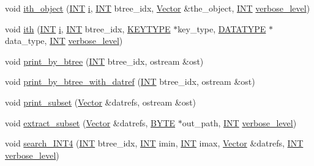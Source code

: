 \begin{DoxyCompactItemize}
\item 
void \mbox{\hyperlink{classdatabase_a1516bb38a4c846172354291271700d07}{ith\+\_\+object}} (\mbox{\hyperlink{galois_8h_a09fddde158a3a20bd2dcadb609de11dc}{I\+NT}} \mbox{\hyperlink{alphabet2_8_c_acb559820d9ca11295b4500f179ef6392}{i}}, \mbox{\hyperlink{galois_8h_a09fddde158a3a20bd2dcadb609de11dc}{I\+NT}} btree\+\_\+idx, \mbox{\hyperlink{class_vector}{Vector}} \&the\+\_\+object, \mbox{\hyperlink{galois_8h_a09fddde158a3a20bd2dcadb609de11dc}{I\+NT}} \mbox{\hyperlink{simeon_8_c_a818073fbcc2f439e7c56952f67386122}{verbose\+\_\+level}})
\item 
void \mbox{\hyperlink{classdatabase_af17af33b686cba55558237b04714108f}{ith}} (\mbox{\hyperlink{galois_8h_a09fddde158a3a20bd2dcadb609de11dc}{I\+NT}} \mbox{\hyperlink{alphabet2_8_c_acb559820d9ca11295b4500f179ef6392}{i}}, \mbox{\hyperlink{galois_8h_a09fddde158a3a20bd2dcadb609de11dc}{I\+NT}} btree\+\_\+idx, \mbox{\hyperlink{discreta_8h_a535c8df88e5939fd8a1a3d083e75124a}{K\+E\+Y\+T\+Y\+PE}} $\ast$key\+\_\+type, \mbox{\hyperlink{discreta_8h_abf512b6b30146dda9c59049478bf3e99}{D\+A\+T\+A\+T\+Y\+PE}} $\ast$data\+\_\+type, \mbox{\hyperlink{galois_8h_a09fddde158a3a20bd2dcadb609de11dc}{I\+NT}} \mbox{\hyperlink{simeon_8_c_a818073fbcc2f439e7c56952f67386122}{verbose\+\_\+level}})
\item 
void \mbox{\hyperlink{classdatabase_ac45ae44f2a861557ced6e5ab7c146717}{print\+\_\+by\+\_\+btree}} (\mbox{\hyperlink{galois_8h_a09fddde158a3a20bd2dcadb609de11dc}{I\+NT}} btree\+\_\+idx, ostream \&ost)
\item 
void \mbox{\hyperlink{classdatabase_af84030a29b31944d6763974ac4f774b5}{print\+\_\+by\+\_\+btree\+\_\+with\+\_\+datref}} (\mbox{\hyperlink{galois_8h_a09fddde158a3a20bd2dcadb609de11dc}{I\+NT}} btree\+\_\+idx, ostream \&ost)
\item 
void \mbox{\hyperlink{classdatabase_a8b454f5428b3f00a2de497f21d73f3fa}{print\+\_\+subset}} (\mbox{\hyperlink{class_vector}{Vector}} \&datrefs, ostream \&ost)
\item 
void \mbox{\hyperlink{classdatabase_abeb9113b3b9f544afe25bd16fd69662d}{extract\+\_\+subset}} (\mbox{\hyperlink{class_vector}{Vector}} \&datrefs, \mbox{\hyperlink{galois_8h_ab6cc7b4aeb6ea31aba2b3fbfc83ff5e6}{B\+Y\+TE}} $\ast$out\+\_\+path, \mbox{\hyperlink{galois_8h_a09fddde158a3a20bd2dcadb609de11dc}{I\+NT}} \mbox{\hyperlink{simeon_8_c_a818073fbcc2f439e7c56952f67386122}{verbose\+\_\+level}})
\item 
void \mbox{\hyperlink{classdatabase_aeda62e67888923cd968674ec2ed08007}{search\+\_\+\+I\+N\+T4}} (\mbox{\hyperlink{galois_8h_a09fddde158a3a20bd2dcadb609de11dc}{I\+NT}} btree\+\_\+idx, \mbox{\hyperlink{galois_8h_a09fddde158a3a20bd2dcadb609de11dc}{I\+NT}} imin, \mbox{\hyperlink{galois_8h_a09fddde158a3a20bd2dcadb609de11dc}{I\+NT}} imax, \mbox{\hyperlink{class_vector}{Vector}} \&datrefs, \mbox{\hyperlink{galois_8h_a09fddde158a3a20bd2dcadb609de11dc}{I\+NT}} \mbox{\hyperlink{simeon_8_c_a818073fbcc2f439e7c56952f67386122}{verbose\+\_\+level}})

\end{DoxyCompactItemize}
